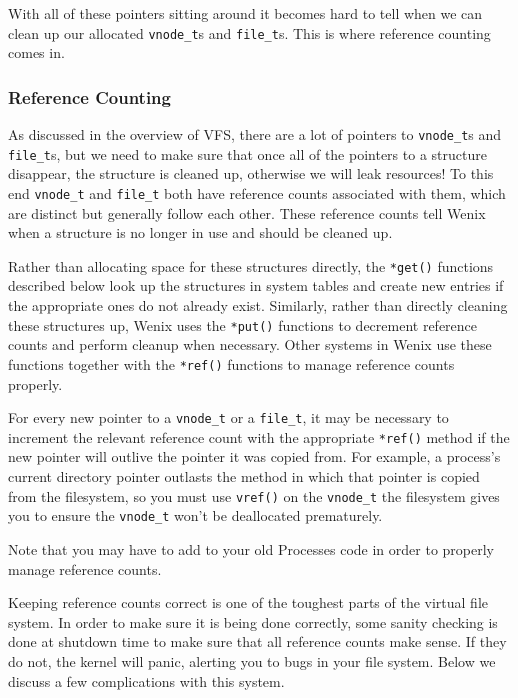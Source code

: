 With all of these pointers sitting around it becomes hard to tell when we can clean up our allocated \texttt{vnode\_t}s and \texttt{file\_t}s. This is where reference counting comes in.


\subsubsection{Reference Counting}

As discussed in the overview of VFS, there are a lot of pointers to \texttt{vnode\_t}s and \texttt{file\_t}s, but we need to make sure that once all of the pointers to a structure disappear, the structure is cleaned up, otherwise we will leak resources! To this end \texttt{vnode\_t} and \texttt{file\_t} both have reference counts associated with them, which are distinct but generally follow each other. These reference counts tell Wenix when a structure is no longer in use and should be cleaned up.

Rather than allocating space for these structures directly, the \texttt{*get()} functions described below look up the structures in system tables and create new entries if the appropriate ones do not already exist. Similarly, rather than directly cleaning these structures up, Wenix uses the \texttt{*put()} functions to decrement reference counts and perform cleanup when necessary. Other systems in Wenix use these functions together with the \texttt{*ref()} functions to manage reference counts properly.

For every new pointer to a \texttt{vnode\_t} or a \texttt{file\_t}, it may be necessary to increment the relevant reference count with the appropriate \texttt{*ref()} method if the new pointer will outlive the pointer it was copied from. For example, a process's current directory pointer outlasts the method in which that pointer is copied from the filesystem, so you must use \texttt{vref()} on the \texttt{vnode\_t} the filesystem gives you to ensure the \texttt{vnode\_t} won't be deallocated prematurely.

Note that you may have to add to your old Processes code in order to properly manage reference counts.

Keeping reference counts correct is one of the toughest parts of the virtual file system. In order to make sure it is being done correctly, some sanity checking is done at shutdown time to make sure that all reference counts make sense. If they do not, the kernel will panic, alerting you to bugs in your file system. Below we discuss a few complications with this system.

